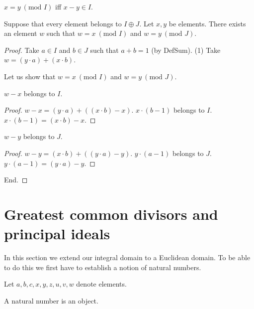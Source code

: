 \documentclass[english]{article}
\renewcommand{\mod}{\text{mod }}
\begin{document}
  \begin{forthel}
    \begin{definition}\label{DefMod}
      $x = y ~(\mod I)$ iff $x - y \in I$.
    \end{definition}

    \begin{theorem}\label{ChineseRemainder}
      Suppose that every element belongs to $I \oplus J$.
      Let $x, y$ be elements.
      There exists an element $w$ such that $w = x ~(\mod I)$ and
      $w = y ~(\mod J)$.
    \end{theorem}
    \begin{proof}
      Take $a \in I$ and $b \in J$ such that $a + b = 1$ (by DefSum).
      (1) Take $w = (y \cdot a) + (x \cdot b)$.

      Let us show that $w = x ~(\mod I)$ and $w = y ~(\mod J)$.

        $w - x$ belongs to $I$.
        \begin{proof}
          $w - x = (y \cdot a) + ((x \cdot b) - x)$.
          $x \cdot (b - 1)$ belongs to $I$.
          $x \cdot (b - 1) = (x \cdot b) - x$.
        \end{proof}

        $w - y$ belongs to $J$.
        \begin{proof}
          $w - y = (x \cdot b) + ((y \cdot a) - y)$.
          $y \cdot (a - 1)$ belongs to $J$.
          $y \cdot (a - 1) = (y \cdot a) - y$.
        \end{proof}
      End.
    \end{proof}
  \end{forthel}


  \section{Greatest common divisors and principal ideals}

  In this section we extend our integral domain to a Euclidean domain. To be
  able to do this we first have to establish a notion of natural numbers.

  \begin{forthel}
    Let $a,b,c,x,y,z,u,v,w$ denote elements.

    \begin{signature}\label{NatSort}
      A natural number is an object.
    \end{signature}

  \end{forthel}
\end{document}

